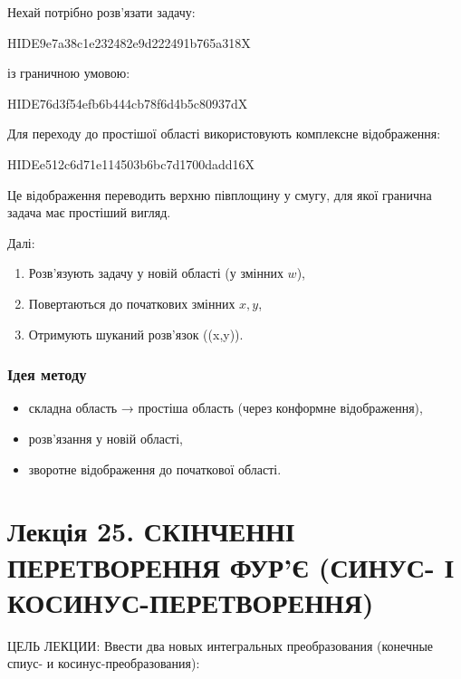 \documentclass[
  ukrainian,
]{article}
\providecommand{\tightlist}{%
  \setlength{\itemsep}{0pt}\setlength{\parskip}{0pt}}
\begin{document}
Нехай потрібно розв'язати задачу:

HIDE9e7a38c1e232482e9d222491b765a318X

із граничною умовою:

HIDE76d3f54efb6b444cb78f6d4b5c80937dX

Для переходу до простішої області використовують комплексне
відображення:

HIDEe512c6d71e114503b6bc7d1700dadd16X

Це відображення переводить верхню півплощину у смугу, для якої гранична
задача має простіший вигляд.

Далі:

\begin{enumerate}
\def\labelenumi{\arabic{enumi}.}
\tightlist
\item
  Розв'язують задачу у новій області (у змінних \(w\)),
\item
  Повертаються до початкових змінних \(x, y\),
\item
  Отримують шуканий розв'язок (\varphi(x,y)).
\end{enumerate}

\subsubsection{Ідея
методу}\label{ux456ux434ux435ux44f-ux43cux435ux442ux43eux434ux443}

\begin{itemize}
\tightlist
\item
  складна область → простіша область (через конформне відображення),
\item
  розв'язання у новій області,
\item
  зворотне відображення до початкової області.
\end{itemize}

\section{Лекція 25. СКІНЧЕННІ ПЕРЕТВОРЕННЯ ФУР'Є (СИНУС- І
КОСИНУС-ПЕРЕТВОРЕННЯ)}\label{ux43bux435ux43aux446ux456ux44f-25.-ux441ux43aux456ux43dux447ux435ux43dux43dux456-ux43fux435ux440ux435ux442ux432ux43eux440ux435ux43dux43dux44f-ux444ux443ux440ux454-ux441ux438ux43dux443ux441--ux456-ux43aux43eux441ux438ux43dux443ux441-ux43fux435ux440ux435ux442ux432ux43eux440ux435ux43dux43dux44f}

ЦЕЛЬ ЛЕКЦИИ: Ввести два новых интегральных преобразования (конечные
спиус- и косинус-преобразования):
\end{document}
